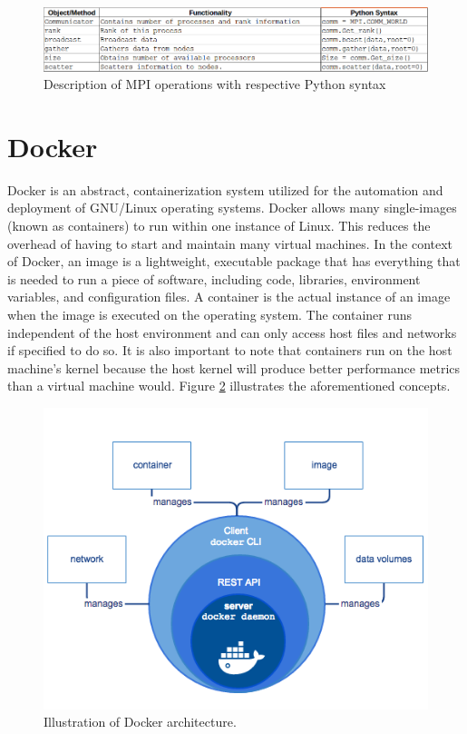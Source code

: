 \begin{figure}
\centering
\includegraphics[scale=0.5]{Figures/table-syntax}
\decoRule
\caption[MPI Table]{Description of MPI operations with respective Python syntax}
\label{fig:MPI Table}
\end{figure}


\section{Docker}

Docker is an abstract, containerization system utilized for the automation and deployment of GNU/Linux operating systems.  Docker allows many single-images (known as containers) to run within one instance of Linux. This reduces the overhead of having to start and maintain many virtual machines.
    In the context of Docker, an image is a lightweight, executable package that has everything that is needed to run a piece of software, including code, libraries, environment variables, and configuration files. A container is the actual instance of an image when the image is executed on the operating system. The container runs independent of the host environment and can only access host files and networks if specified to do so. It is also important to note that containers run on the host machine’s kernel because the host kernel will produce better performance metrics than a virtual machine would. Figure \ref{fig:Docker Architecture} illustrates the aforementioned concepts.

\begin{figure}
\centering
\includegraphics[scale=0.8]{Figures/docker-diagram}
\decoRule
\caption[Docker Architecture]{Illustration of Docker architecture.}
\label{fig:Docker Architecture}
\end{figure}

